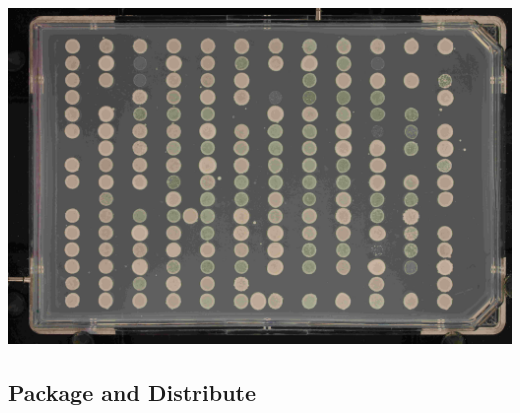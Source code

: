 \begin{Figure}
  \centering
  \includegraphics[width=\linewidth]{K000343_027_001_2015-02-21_19-38-08}
\end{Figure}

\subsection{Package and Distribute}
\label{sec:package-distribute}


